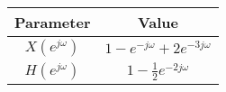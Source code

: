 
    \begin{tabular}{|c|c|}
       \hline
        \textbf{Parameter} & \textbf{Value}\\
        \hline
        $X(e^{j\omega})$ & $1 - e^{-j\omega} + 2e^{-3j\omega}$ \\
        \hline
        $H(e^{j\omega})$ & $1 - \frac{1}{2} e^{-2j\omega}$ \\
        \hline
    \end{tabular}
    
